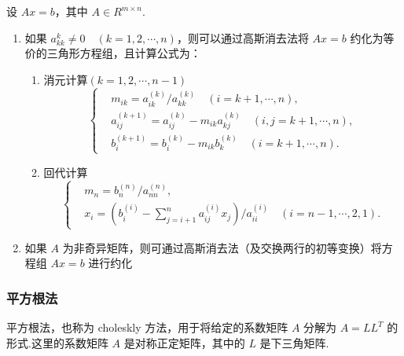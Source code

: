 设 $Ax = b$，其中 $A \in R^{m \times n}$.

\begin{enumerate}
    \item 如果 $a_{kk}^{k} \neq 0\quad(k=1, 2 , \cdots, n)$，则可以通过高斯消去法将 $Ax = b$ 约化为等价的三角形方程组，且计算公式为：
          \begin{enumerate}
              \item 消元计算$(k=1, 2, \cdots, n - 1)$
                    \begin{equation*}
                        \left\{\begin{aligned}
                             & m_{ik}         = a_{ik}^{(k)} / a_{kk}^{(k)} \quad (i = k + 1, \cdots, n),          \\
                             & a_{ij}^{(k+1)} = a_{ij}^{(k)} - m_{ik}a_{kj}^{(k)} \quad (i, j = k + 1, \cdots, n), \\
                             & b_i^{(k+1)}    = b_i^{(k)} - m_{ik}b_k^{(k)} \quad (i = k + 1, \cdots, n).
                        \end{aligned}\right.
                    \end{equation*}
              \item 回代计算
                    \begin{equation*}
                        \left\{\begin{aligned}
                             & m_n = b_n^{(n)} / a_{nn}^{(n)},                                                                         \\
                             & x_i = (b_i^{(i)} - \sum_{j = i + 1}^n a_{ij}^{(i)}x_j) / a_{ii} ^{(i)} \quad (i = n - 1, \cdots, 2, 1).
                        \end{aligned}\right.
                    \end{equation*}
          \end{enumerate}
    \item 如果 $A$ 为非奇异矩阵，则可通过高斯消去法（及交换两行的初等变换）将方程组 $Ax = b$ 进行约化
\end{enumerate}

\subsubsection{平方根法}

平方根法，也称为 choleskly 方法，用于将给定的系数矩阵 \(A\) 分解为
\(A = L L^T\) 的形式.这里的系数矩阵 \(A\) 是对称正定矩阵，其中的 \(L\)
是下三角矩阵.

